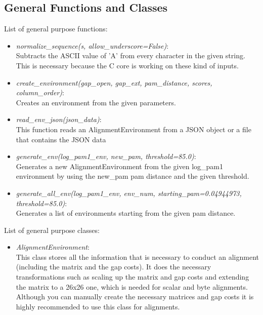 \documentclass[12pt]{article}
\begin{document}
\subsection{General Functions and Classes}
List of general purpose functions:
\begin{itemize}

  \item \emph{normalize\_sequence(s, allow\_underscore=False)}:\\ 
   Subtracts the ASCII value of 'A' from every character in the given string. This is necessary because the C core
    is working on these kind of inputs.
  \item \emph{create\_environment(gap\_open, gap\_ext, pam\_distance, scores, column\_order)}:\\
  Creates an environment from the given parameters.
  \item \emph{read\_env\_json(json\_data)}:\\
  This function reads an AlignmentEnvironment from a JSON object or a file that contains the JSON data
  \item \emph{generate\_env(log\_pam1\_env, new\_pam, threshold=85.0)}:\\
    Generates a new AlignmentEnvironment from the given log\_pam1 environment by using the new\_pam pam distance and
    the given threshold.
  \item \emph{generate\_all\_env(log\_pam1\_env, env\_num, starting\_pam=0.04944973,  threshold=85.0)}:\\
        Generates a list of environments starting from the given pam distance.
\end{itemize}
List of general purpose classes:
\begin{itemize}
	\item \emph{AlignmentEnvironment}:\\
	    This class stores all the information that is necessary to conduct an alignment (including the matrix and the gap
    costs). It does the necessary transformations such as scaling up the matrix and gap costs and extending the matrix
    to a 26x26 one, which is needed for scalar and byte alignments. Although you can manually create the necessary
    matrices and gap costs it is highly recommended to use this class for alignments.
\end{itemize}
\end{document}
